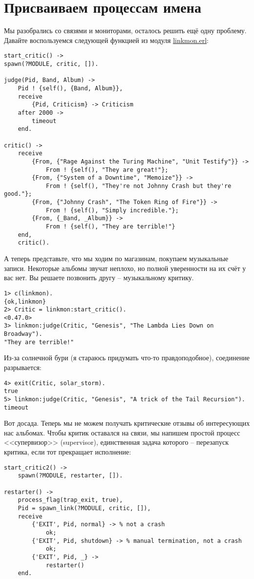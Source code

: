 \section{Присваиваем процессам имена}
Мы разобрались со связями и мониторами, осталось решить ещё одну проблему.
Давайте воспользуемся следующей функцией из модуля \href{http://learnyousomeerlang/original/learnyousomeerlang.com/static/erlang/linkmon.erl}{linkmon.erl}:
\begin{lstlisting}[style=erlang]
start_critic() ->
spawn(?MODULE, critic, []).
 
judge(Pid, Band, Album) ->
    Pid ! {self(), {Band, Album}},
    receive
        {Pid, Criticism} -> Criticism
    after 2000 ->
        timeout
    end.
 
critic() ->
    receive
        {From, {"Rage Against the Turing Machine", "Unit Testify"}} ->
            From ! {self(), "They are great!"};
        {From, {"System of a Downtime", "Memoize"}} ->
            From ! {self(), "They're not Johnny Crash but they're good."};
        {From, {"Johnny Crash", "The Token Ring of Fire"}} ->
            From ! {self(), "Simply incredible."};
        {From, {_Band, _Album}} ->
            From ! {self(), "They are terrible!"}
    end,
    critic().
\end{lstlisting}

А теперь представьте, что мы ходим по магазинам, покупаем музыкальные записи.
Некоторые альбомы звучат неплохо, но полной уверенности на их счёт у вас нет.
Вы решаете позвонить другу \--- музыкальному критику.
\begin{lstlisting}[style=erlang]
1> c(linkmon).                        
{ok,linkmon}
2> Critic = linkmon:start_critic().
<0.47.0>
3> linkmon:judge(Critic, "Genesis", "The Lambda Lies Down on Broadway").
"They are terrible!"
\end{lstlisting}

Из\--за солнечной бури (я стараюсь придумать что\--то правдоподобное), соединение разрывается:
\begin{lstlisting}[style=erlang]
4> exit(Critic, solar_storm).
true
5> linkmon:judge(Critic, "Genesis", "A trick of the Tail Recursion").
timeout
\end{lstlisting}

Вот досада.
Теперь мы не можем получать критические отзывы об интересующих нас альбомах.
Чтобы критик оставался на связи, мы напишем простой процесс <<супервизор>> (supervisor), единственная задача которого \--- перезапуск критика, если тот прекращает исполнение:
\begin{lstlisting}[style=erlang]
start_critic2() ->
    spawn(?MODULE, restarter, []).
 
restarter() ->
    process_flag(trap_exit, true),
    Pid = spawn_link(?MODULE, critic, []),
    receive
        {'EXIT', Pid, normal} -> % not a crash
            ok;
        {'EXIT', Pid, shutdown} -> % manual termination, not a crash
            ok;
        {'EXIT', Pid, _} ->
            restarter()
    end.
\end{lstlisting}

